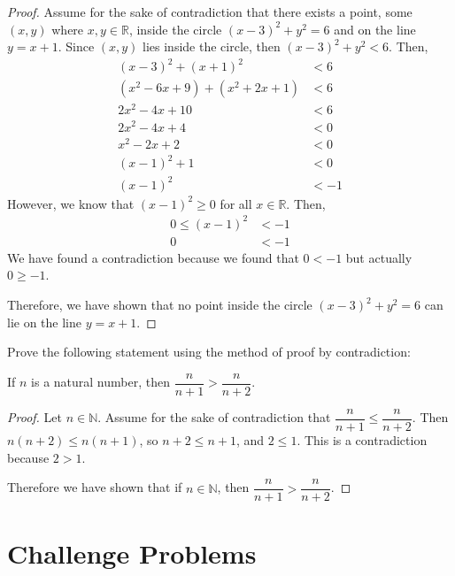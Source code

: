 \documentclass[12 pt]{exam}
\begin{document}
\begin{questions}
\begin{solution}
\begin{proof}
    Assume for the sake of contradiction that there exists a point, some $(x,y)$ where
    $x,y \in \mathbb{R}$, inside the circle $(x-3)^2 + y^2 =6$ and on the line $y=x+1$.
    Since $(x, y)$ lies inside the circle, then $(x-3)^2 + y^2 < 6$. Then,
    \begin{align*}
        (x-3)^2 + (x+1)^2 &< 6 \\
        (x^2 - 6x + 9) + (x^2 + 2x + 1) &< 6 \\
        2x^2 - 4x + 10 &< 6 \\
        2x^2 - 4x + 4 &< 0 \\
        x^2 - 2x + 2 &< 0 \\
        (x - 1)^2 + 1&< 0 \\
        (x - 1)^2 &< -1
    \end{align*}
    However, we know that $(x-1)^2 \ge 0$ for all $x \in \mathbb{R}$. Then,
    \begin{align*}
        0 \le (x - 1)^2 &< -1\\
        0 &< -1
    \end{align*}
    We have found a contradiction because we found that $0 <-1$ but actually $0 \ge -1$.

    Therefore, we have shown that no point inside the circle $(x-3)^2 + y^2 = 6$ can lie on the line $y=x+1$.
\end{proof}
\end{solution}


\question Prove the following statement using the method of proof by contradiction:

If $n$ is a natural number, then $\dfrac{n}{n+1}>\dfrac{n}{n+2}.$

\begin{solution}
\begin{proof}
    Let $n \in \mathbb{N}$. Assume for the sake of contradiction that $\dfrac{n}{n+1} \le \dfrac{n}{n+2}$.
    Then $n(n+2) \le n(n+1)$, so $n+2 \le n+1$, and $2 \le 1$. This is a contradiction because $2 > 1$.

    Therefore we have shown that if $n \in \mathbb{N}$, then $\dfrac{n}{n+1} > \dfrac{n}{n+2}$.
\end{proof}
\end{solution}


\newpage
\section*{Challenge Problems}


\end{questions}
\end{document}
